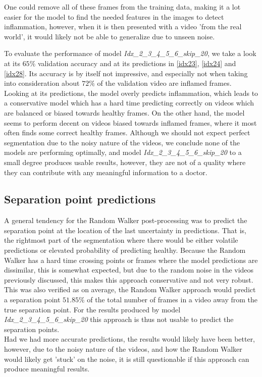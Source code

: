 One could remove all of these frames from the training data, making it a lot easier for the model to find the needed features in the images to detect inflammation, however, when it is then presented with a video 'from the real world', it would likely not be able to generalize due to unseen noise.

To evaluate the performance of model \textit{Idx\_2\_3\_4\_5\_6\_skip\_20}, we take a look at its $65\%$ validation accuracy and at its predictions in \autoref{idx23}, \autoref{idx24} and \autoref{idx28}. Its accuracy is by itself not impressive, and especially not when taking into consideration about $72\%$ of the validation video are inflamed frames. Looking at its predictions, the model overly predicts inflammation, which leads to a conservative model which has a hard time predicting correctly on videos which are balanced or biased towards healthy frames. On the other hand, the model seems to perform decent on videos biased towards inflamed frames, where it most often finds some correct healthy frames. Although we should not expect perfect segmentation due to the noisy nature of the videos, we conclude none of the models are performing optimally, and model \textit{Idx\_2\_3\_4\_5\_6\_skip\_20} to a small degree produces usable results, however, they are not of a quality where they can contribute with any meaningful information to a doctor.

\subsection{Separation point predictions}
A general tendency for the Random Walker post-processing was to predict the separation point at the location of the last uncertainty in predictions. That is, the rightmost part of the segmentation where there would be either volatile predictions or elevated probability of predicting healthy. Because the Random Walker has a hard time crossing points or frames where the model predictions are dissimilar, this is somewhat expected, but due to the random noise in the videos previously discussed, this makes this approach conservative and not very robust. This was also verified as on average, the Random Walker approach would predict a separation point $51.85\%$ of the total number of frames in a video away from the true separation point. For the results produced by model \textit{Idx\_2\_3\_4\_5\_6\_skip\_20} this approach is thus not usable to predict the separation points.\\
Had we had more accurate predictions, the results would likely have been better, however, due to the noisy nature of the videos, and how the Random Walker would likely get 'stuck' on the noise, it is still questionable if this approach can produce meaningful results.

